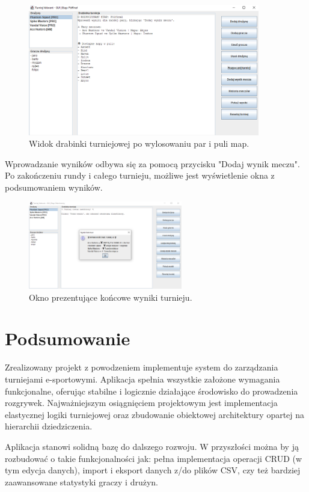 \documentclass[12pt, a4paper]{article}
\begin{document}
\begin{figure}[H]
 \centering
 \includegraphics[width=0.9\textwidth]{rysunek3.png} 
 \caption{Widok drabinki turniejowej po wylosowaniu par i puli map.}
 \label{fig:drabinka}
\end{figure}

Wprowadzanie wyników odbywa się za pomocą przycisku "Dodaj wynik meczu". Po zakończeniu rundy i całego turnieju, możliwe jest wyświetlenie okna z podsumowaniem wyników.

\begin{figure}[H]
 \centering
 \includegraphics[width=0.6\textwidth]{rysunek4.png} 
 \caption{Okno prezentujące końcowe wyniki turnieju.}
 \label{fig:wyniki}
\end{figure}

\section{Podsumowanie}
Zrealizowany projekt z powodzeniem implementuje system do zarządzania turniejami e-sportowymi. Aplikacja spełnia wszystkie założone wymagania funkcjonalne, oferując stabilne i logicznie działające środowisko do prowadzenia rozgrywek. Najważniejszym osiągnięciem projektowym jest implementacja elastycznej logiki turniejowej oraz zbudowanie obiektowej architektury opartej na hierarchii dziedziczenia.

Aplikacja stanowi solidną bazę do dalszego rozwoju. W przyszłości można by ją rozbudować o takie funkcjonalności jak: pełna implementacja operacji CRUD (w tym edycja danych), import i eksport danych z/do plików CSV, czy też bardziej zaawansowane statystyki graczy i drużyn.
\end{document}
